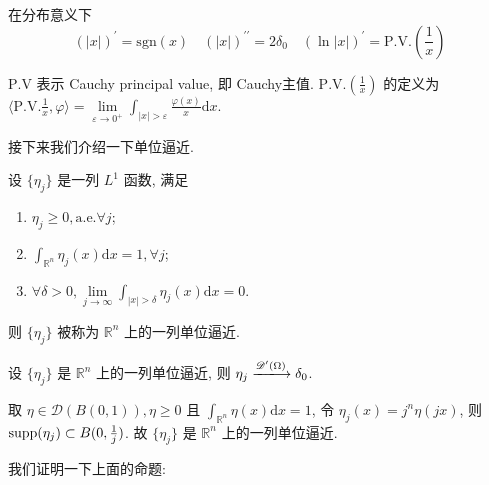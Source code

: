 \documentclass[11pt]{ctexart}[UTF8]
\begin{document}
\begin{example}
    在分布意义下
    \begin{equation*}
        (|x|)^{\prime} = \mathrm{sgn} (x)\quad (|x|)^{\prime\prime} = 2\delta_{0}\quad (\ln|x|)^{\prime} = \mathrm{P.V.} (\frac{1}{x})
    \end{equation*}
\end{example}
\begin{remark}
    $\mathrm{P.V}$ 表示 Cauchy principal value, 即 Cauchy主值. $\mathrm{P.V.} (\frac{1}{x})$ 的定义为 $\langle \mathrm{P.V.} \frac{1}{x}, \varphi \rangle = \lim\limits_{\varepsilon \to 0^+} \int_{|x|>\varepsilon} \frac{\varphi(x)}{x} \mathrm{d}x$.
\end{remark}
接下来我们介绍一下单位逼近.
\begin{definition}[单位逼近]\label{approxinations to the identity}
    设 $\{ \eta_{j} \}$ 是一列 $L^{1}$ 函数, 满足
    \begin{enumerate}
        \item $\eta_{j} \geq 0, \mathrm{a.e.}  \forall j$;
        \item $\int_{\mathbb{R}^{n}} \eta_{j}(x) \mathrm{d}x = 1, \forall j$;
        \item $\forall \delta > 0, \lim\limits_{j \to \infty} \int_{|x|>\delta} \eta_{j}(x) \mathrm{d}x = 0$.
    \end{enumerate}
    则 $\{ \eta_{j} \}$ 被称为 $\mathbb{R}^{n}$ 上的一列单位逼近.
\end{definition}
\begin{proposition}\leavevmode
    设 $\{ \eta_{j} \}$ 是 $\mathbb{R}^{n}$ 上的一列单位逼近, 则 $\eta_{j} \xlongrightarrow{\mathscr{D}^{\prime}(\Omega)} \delta_{0}$.
\end{proposition}
\begin{remark}
    取 $\eta \in \mathscr{D}(B(0,1)), \eta \geq 0$ 且 $\int_{\mathbb{R}^{n}} \eta(x) \mathrm{d}x = 1$, 
    令 $\eta_{j}(x) = j^{n} \eta(jx)$, 则 $\operatorname{supp}(\eta_{j}) \subset B(0,\frac{1}{j})$. 故 $\{ \eta_{j} \}$ 是 $\mathbb{R}^{n}$ 上的一列单位逼近.
\end{remark}
我们证明一下上面的命题:
\end{document}
